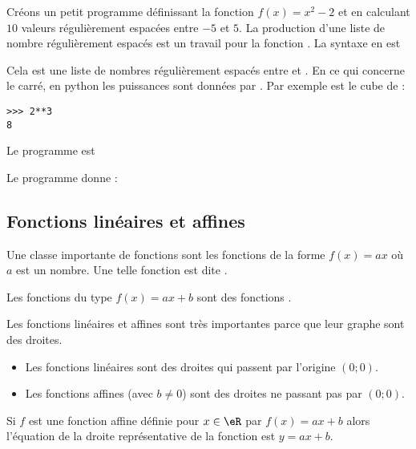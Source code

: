 \begin{example}
    Créons un petit programme définissant la fonction \( f(x)=x^2-2\) et en calculant \( 10\) valeurs régulièrement espacées entre \( -5\) et \( 5\). La production d'une liste de nombre régulièrement espacés est un travail pour la fonction . La syntaxe en est 
\begin{quote}
\end{quote}
Cela est une liste de  nombres régulièrement espacés entre  et . En ce qui concerne le carré, en python les puissances sont données par \info{**}. Par exemple  est le cube de  :
\begin{verbatim}
>>> 2**3
8
\end{verbatim}
Le programme est



Le programme donne :


    
\end{example}

\subsection{Fonctions linéaires et affines}

\begin{definition}
    Une classe importante de fonctions sont les fonctions de la forme \( f(x)=ax\) où \( a\) est un nombre. Une telle fonction est dite . 

    Les fonctions du type \( f(x)=ax+b\) sont des fonctions . 
\end{definition}


\begin{Aretenir}
    Les fonctions linéaires et affines sont très importantes parce que leur graphe sont des droites. 
    \begin{itemize}
        \item 
    Les fonctions linéaires sont des droites qui passent par l'origine \( (0;0)\).
    \item
    Les fonctions affines (avec \( b\neq 0\)) sont des droites ne passant pas par \( (0;0)\).
    \end{itemize}
\end{Aretenir}
Si $f$ est une fonction affine définie pour $x\in\eR$ par $f(x)=ax+b$ alors l'équation de la droite représentative de la fonction est $y=ax+b$. 

